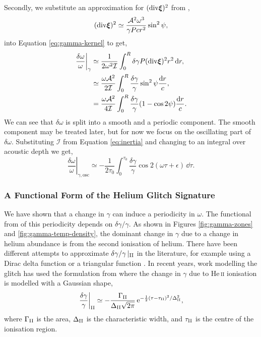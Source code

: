 Secondly, we substitute an approximation for \((\mathrm{div} \bm{\xi})^2\) from \citet{Gough1993},
%
\begin{equation}
    (\mathrm{div} \bm{\xi})^2 \simeq \frac{{\mathcal{A}}^2 \omega^3}{\gamma P c r^2} \sin^2\psi, \label{eq:div-xi}
\end{equation}
%
into Equation \ref{eq:gamma-kernel} to get,
%
\begin{align}
    \left.\frac{\delta\omega}{\omega}\right|_\gamma &\simeq \frac{1}{2\omega^2\mathcal{I}} \int_0^{R} \delta\gamma P (\mathrm{div} \bm{\xi})^2 r^2 \, \mathrm{d} r, \notag \\
    &\simeq \frac{\omega {\mathcal{A}}^2}{2 \mathcal{I}} \int_0^{R} \frac{\delta\gamma}{\gamma}\sin^2\psi\frac{\mathrm{d} r}{c}, \notag \\
    &= \frac{\omega {\mathcal{A}}^2}{4 \mathcal{I}} \int_0^{R} \frac{\delta\gamma}{\gamma}(1 - \cos 2\psi)\frac{\mathrm{d} r}{c}.
\end{align}
%
We can see that \(\delta\omega\) is split into a smooth and a periodic component. The smooth component may be treated later, but for now we focus on the oscillating part of \(\delta\omega\). Substituting \(\mathcal{I}\) from Equation \ref{eq:inertia} and changing to an integral over acoustic depth we get,
%
\begin{equation}
    \left.\frac{\delta\omega}{\omega}\right|_{\gamma,\mathrm{osc}} \simeq - \frac{1}{2\tau_0} \int_0^{\tau_0} \frac{\delta\gamma}{\gamma} \cos 2 (\omega\tau + \epsilon) \, \dd \tau. \label{eq:omega-osc}
\end{equation}
%

\subsubsection{A Functional Form of the Helium Glitch Signature}

We have shown that a change in \(\gamma\) can induce a periodicity in \(\omega\). The functional from of this periodicity depends on \(\delta\gamma/\gamma\). As shown in Figures \ref{fig:gamma-zones} and \ref{fig:gamma-temp-density}, the dominant change in \(\gamma\) due to a change in helium abundance is from the second ionisation of helium. There have been different attempts to approximate \(\delta\gamma/\gamma\,|_{{\mathrm{II}}}\) in the literature, for example using a Dirac delta function or a triangular function \citep{Monteiro.Christensen-Dalsgaard.ea1994,Monteiro.Thompson2005}. In recent years, work modelling the glitch has used the formulation from \citet{Houdek.Gough2007} where the change in \(\gamma\) due to He\,\textsc{ii} ionisation is modelled with a Gaussian shape,
%
\begin{equation}
    \left.\frac{\delta\gamma}{\gamma}\right|_{{\mathrm{II}}} \simeq - \frac{\Gamma_{{\mathrm{II}}}}{\Delta_{{\mathrm{II}}} \sqrt{2\pi}} \, \mathrm{e}^{- \frac12{(\tau - \tau_{{\mathrm{II}}})^2}/{\Delta_{{\mathrm{II}}}^2} }, \label{eq:he-gamma}
\end{equation}
%
where \(\Gamma_{{\mathrm{II}}}\) is the area, \(\Delta_{{\mathrm{II}}}\) is the characteristic width, and \(\tau_{{\mathrm{II}}}\) is the centre of the ionisation region.

